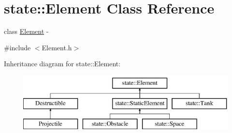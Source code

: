 \hypertarget{classstate_1_1_element}{}\section{state\+:\+:Element Class Reference}
\label{classstate_1_1_element}


class \hyperlink{classstate_1_1_element}{Element} -\/  




{\ttfamily \#include $<$Element.\+h$>$}

Inheritance diagram for state\+:\+:Element\+:\begin{figure}[H]
\begin{center}
\leavevmode
\includegraphics[height=3.000000cm]{classstate_1_1_element}
\end{center}
\end{figure}
